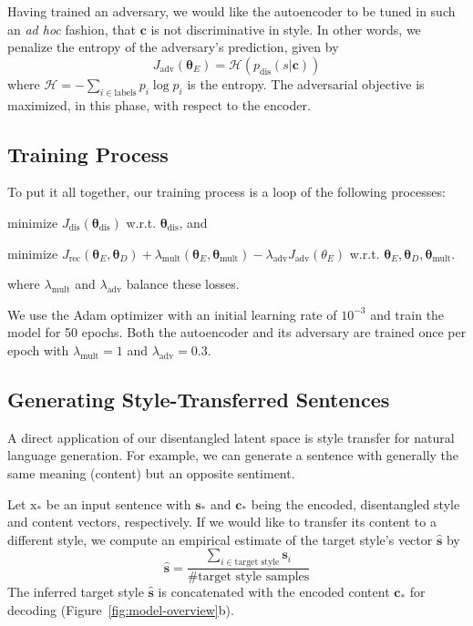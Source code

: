 \documentclass[11pt,a4paper]{article}
\newcommand{\rmx}{\mathrm x}
\begin{document}
Having trained an adversary, we would like the autoencoder to be tuned in such an \textit{ad hoc} fashion, that $\bm c$ is not discriminative in style. In other words, we penalize the entropy of the adversary's prediction, given by
\begin{equation}
	J_\text{adv}(\bm\theta_E)=\mathcal{H}(p_\text{dis}(s|\bm c))
\end{equation}
where $\mathcal{H}=-\sum_{i\in\text{labels}}p_i\log p_i$ is the entropy. The adversarial objective is maximized, in this phase, with respect to the encoder.



\subsection{Training Process}

To put it all together, our training process is a loop of the following processes:
\begin{compactenum}
	\item minimize $J_\text{dis}(\bm\theta_\text{dis})$ w.r.t. $\bm\theta_\text{dis}$, and
	\item minimize $J_\text{rec}(\bm\theta_E, \bm\theta_D) + \lambda_\text{mult}(\bm\theta_E,\bm\theta_\text{mult}) -\lambda_\text{adv}
		J_\text{adv}(\theta_E)$ w.r.t. $\bm\theta_E, \bm\theta_D, \bm\theta_\text{mult}$.
\end{compactenum}
where $\lambda_\text{mult}$ and $\lambda_\text{adv}$ balance these losses.

We use the Adam optimizer \cite{kingma2014adam} with an initial learning rate of $10^{-3}$ and train the model for 50 epochs. Both the autoencoder and its adversary are trained once per epoch with $\lambda_\text{mult} = 1$ and $\lambda_\text{adv} = 0.3$.

\subsection{Generating Style-Transferred Sentences} \label{ss:prediction}

A direct application of our disentangled latent space is style transfer for natural language generation. For example, we can generate a sentence with generally the same meaning (content) but an opposite sentiment.

Let $\rmx_*$ be an input sentence with $\bm s_*$ and $\bm c_*$ being the encoded, disentangled style and content vectors, respectively. If we would like to transfer its content to a different style, we compute an empirical estimate of the target style's vector $\hat{\bm s}$ by
\begin{equation*}
	\hat{\bm s}=\frac{\sum_{i\in\text{target style}}\bm s_i}{\text{\# target style samples}}
\end{equation*}
The inferred target style $\hat{\bm s}$ is concatenated with the encoded content $\bm c_*$ for decoding (Figure~\ref{fig:model-overview}b).
\end{document}
